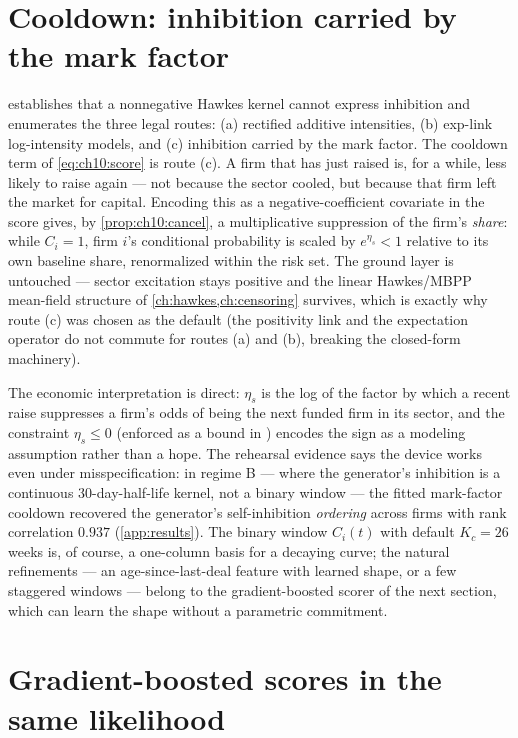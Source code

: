 \section{Cooldown: inhibition carried by the mark factor}\label{ch10:sec:cooldown}

 establishes that a nonnegative Hawkes kernel cannot
express inhibition and enumerates the three legal routes: (a) rectified
additive intensities, (b) exp-link log-intensity models, and (c)
inhibition carried by the mark factor. The cooldown term of
\cref{eq:ch10:score} is route (c). A firm that has just raised is, for a
while, less likely to raise again --- not because the sector cooled, but
because that firm left the market for capital. Encoding this as a
negative-coefficient covariate in the score gives, by
\cref{prop:ch10:cancel}, a multiplicative suppression of the firm's
\emph{share}: while $C_i = 1$, firm $i$'s conditional probability is
scaled by $e^{\eta_s} < 1$ relative to its own baseline share,
renormalized within the risk set. The ground layer is untouched --- sector
excitation stays positive and the linear Hawkes/MBPP mean-field structure
of \cref{ch:hawkes,ch:censoring} survives, which is exactly why route (c)
was chosen as the default (the positivity link and the expectation
operator do not commute for routes (a) and (b), breaking the closed-form
machinery).

The economic interpretation is direct: $\eta_s$ is the log of the factor
by which a recent raise suppresses a firm's odds of being the next funded
firm in its sector, and the constraint $\eta_s \le 0$ (enforced as a
bound in ) encodes the sign as a modeling
assumption rather than a hope. The rehearsal evidence says the device
works even under misspecification: in regime B --- where the generator's
inhibition is a continuous 30-day-half-life kernel, not a binary window
--- the fitted mark-factor cooldown recovered the generator's
self-inhibition \emph{ordering} across firms with rank correlation
$0.937$ (\cref{app:results}). The binary window $C_i(t)$ with default
$K_c = 26$ weeks is, of course, a one-column basis for a decaying curve;
the natural refinements --- an age-since-last-deal feature with learned
shape, or a few staggered windows --- belong to the gradient-boosted
scorer of the next section, which can learn the shape without a
parametric commitment.

\section{Gradient-boosted scores in the same likelihood}\label{ch10:sec:boosted}

